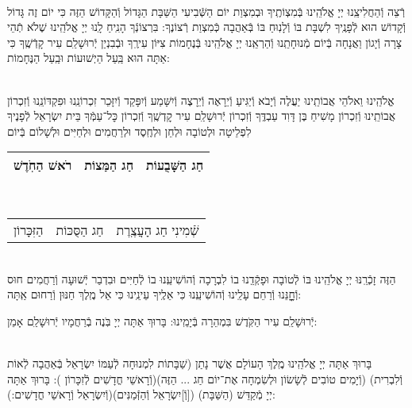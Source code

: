 \documentclass[twoside, openany, parskip=half, 11pt]{book}
\begin{document}
\vspace{-.25\baselineskip}
\begin{sometimes}

\shabbos\\
רְֿצֵה וְֿהַחֲלִיצֵֽנוּ יְיָ אֱלֹהֵֽינוּ בְּֿמִצְוֹתֶֽיךָ וּבְמִצְוַת יוֹם הַשְּֿׁבִיעִי הַשַּׁבָּת הַגָּדוֹל וְֿהַקָּדוֹשׁ הַזֶּה כִּי יוֹם זֶה גָּדוֹל וְֿקָדוֹשׁ הוּא לְֿפָנֶֽיךָ לִשְׁבָּת בּוֹ וְֿלָנֽוּחַ בּוֹ בְּֿאַהֲבָה כְּֿמִצְוַת רְֿצוֹנֶךָ: בִּרְצוֹנְֿךָ הָנִֽיחַ לָֽנוּ יְיָ אֱלֹהֵֽינוּ שֶׁלֹא תְֿהֵי צָרָה וְֿיָגוֹן וַאֲנָחָה בְּֿיוֹם מְֿנוּחָתֵֽנוּ וְֿהַרְאֵֽנוּ יְיָ אֱלֹהֵֽינוּ בְּֿנֶחָמוֹת צִיּוֹן עִירֶֽךָ וּבְֿבִנְיַן יְֿרוּשָׁלַ‍ִם עִיר קָדְֿשֶֽׁךָ כִּי אַתָּה הוּא בַּֽעַל הַיְשׁוּעוֹת וּבַֽעַל הַנֶּחָמוֹת:


\sepline %

\vspace{-.25\baselineskip}
\\
אֱלֹהֵֽינוּ וֵאלֹהֵי אֲבוֹתֵֽינוּ יַעֲלֶה וְֿיָבֹא וְֿיַגִּיעַ וְֿיֵרָאֶה וְֿיֵרָצֶה וְֿיִשָּׁמַע וְֿיִפָּקֵד וְֿיִזָּכֵר זִכְרוֹנֵֽנוּ וּפִקְדּוֹנֵֽנוּ וְֿזִכְרוֹן אֲבוֹתֵֽינוּ וְֿזִכְרוֹן מָשִׁיחַ בֶּן דָּוִד עַבְדֶּֽךָ וְֿזִכְרוֹן יְֿרוּשָׁלַ‍ִם עִיר קׇדְשֶֽׁךָ וְֿזִכְרוֹן כׇּל־עַמְּֿךָ בֵּית יִשְׂרָאֵל לְֿפָנֶיךָ לִפְלֵיטָה וּלְטוֹבָה וּלְחֵן וּלְחֶֽסֶד וּלְרַחֲמִים וּלְחַיִּים וּלְשָׁלוֹם בְּֿיוֹם\\
\begin{tabular}{c|c|c}
רֹאשׁ הַחֹֽדֶשׁ & חַג הַמַּצוֹת & חַג הַשָּׁבֻעוֹת\\ \hline
\end{tabular}\\
\begin{tabular}{c|c|c}
הַזִּכָּרוֹן & חַג הַסֻּכּוֹת & שְֿׁמִינִי חַג הָעֲצֶֽרֶת
\end{tabular}\\
הַזֶּה זָכְֿרֵֽנּוּ יְיָ אֱלֹהֵֽינוּ בּוֹ לְֿטוֹבָה וּפָקְֿדֵֽנוּ בוֹ לִבְרָכָה וְֿהוֹשִׁיעֵֽנוּ בוֹ לְֿחַיִּים וּבִדְבַר יְֿשׁוּעָה וְֿרַחֲמִים חוּס וְֿחׇׇׇׇׇׇָנֵּנוּ וְֿרַחֵם עָלֵֽינוּ וְֿהוֹשִׁיעֵֽנוּ כִּי אֵלֶֽיךָ עֵינֵֽינוּ כִּי אֵל מֶֽלֶךְ חַנּוּן וְֿרַחוּם אַֽתָּה:

\end{sometimes}

יְֿרוּשָׁלַ‍ִם עִיר הַקֹּֽדֶשׁ בִּמְהֵרָה בְּֿיָמֵֽינוּ: בָּרוּךְ אַתָּה יְיָ בֹּֽנֶה בְֿרַחֲמָיו יְֿרוּשָׁלַ‍ִם אָמֵן:

\begin{sometimes}

\\
בָּרוּךְ אַתָּה יְיָ אֱלֹהֵֽינוּ מֶֽלֶךְ הָעוֹלָם אֲשֶׁר נָתַן (שַׁבָּתוֹת לִמְנוּחָה לְֿעַמּוֹ יִשְׂרָאֵל בְּֿאַהֲבָה לְֿאוֹת וְֿלִבְרִית)
(וְֿיָמִים טוֹבִים לְֿשָׂשׂוֹן וּלְשִׂמְחָה אֶת־יוֹם חַג ... הַזֶּה)(וְֿרָאשֵׁי חֳדָשִׁים לְֿזִכָּרוֹן ):
בָּרוּךְ אַתָּה יְיָ מְֿקַדֵּשׁ (הַשַּׁבָּת) ([וְֿ]יִשְׂרָאֵל וְֿהַזְּֿמַנִּים)(וְֿיִשְׂרָאֵל וְֿרָאשֵׁי חֳדָשִׁים:):

\end{sometimes}
\end{document}
